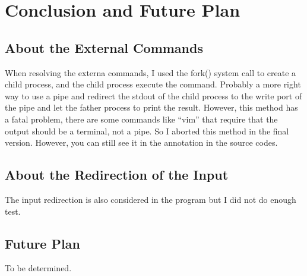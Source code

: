 \documentclass{article}
\begin{document}
\section{Conclusion and Future Plan}
\subsection{About the External Commands}
When resolving the externa commands, I used the fork() system call to create a child process, and the child process execute the command. Probably a more right way to use a pipe and redirect the stdout of the child process to the write port of the pipe and let the father process to print the result. However, this method has a fatal problem, there are some commands like ``vim'' that require that the output should be a terminal, not a pipe. So I aborted this method in the final version. However, you can still see it in the annotation in the source codes.
\subsection{About the Redirection of the Input}
The input redirection is also considered in the program but I did not do enough test.
\subsection{Future Plan}
To be determined. 
\end{document}
